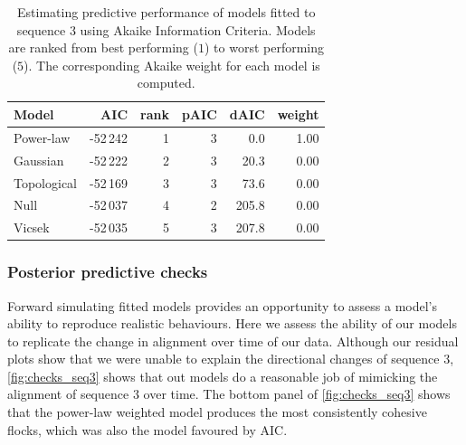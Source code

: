 \begin{table}[tbp]
\begin{tabular}{@{}lrrrrr@{}}
\toprule
Model                       &      AIC & rank & pAIC &  dAIC & weight \\
\midrule
Power-law                   & -52\,242 &    1 &  3 &   0.0 &   1.00 \\
Gaussian                    & -52\,222 &    2 &  3 &  20.3 &   0.00 \\
Topological                 & -52\,169 &    3 &  3 &  73.6 &   0.00 \\
Null                        & -52\,037 &    4 &  2 & 205.8 &   0.00 \\
Vicsek                      & -52\,035 &    5 &  3 & 207.8 &   0.00 \\
\bottomrule
\end{tabular}
\caption{Estimating predictive performance of models fitted to sequence $3$
  using Akaike Information Criteria. Models are ranked from best performing ($1$)
  to worst performing ($5$). The corresponding Akaike weight for each model is
  computed.}
\label{tab:aic_seq3}
\end{table}

\subsubsection{Posterior predictive checks}

Forward simulating fitted models provides an opportunity to assess a model's
ability to reproduce realistic behaviours. Here we assess the ability of our
models to replicate the change in alignment over time of our data. Although our
residual plots show that we were unable to explain the directional changes of
sequence $3$, \cref{fig:checks_seq3} shows that out models do a reasonable job
of mimicking the alignment of sequence $3$ over time. The bottom panel of
\cref{fig:checks_seq3} shows that the power-law weighted model produces the most
consistently cohesive flocks, which was also the model favoured by AIC.

